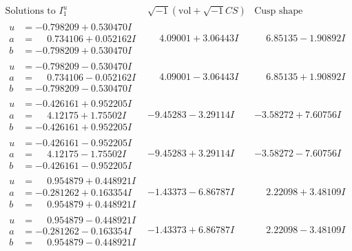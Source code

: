 \documentclass[1p]{elsarticle_modified}
\theoremstyle{definition}
\newcommand{\I}{\sqrt{-1}}
\begin{document}
$$\begin{array}{c|c|c}  
\text{Solutions to }I^u_{1}& \I (\text{vol} + \sqrt{-1}CS) & \text{Cusp shape}\\
 \hline 
\begin{aligned}
u &= -0.798209 + 0.530470 I \\
a &= \phantom{-}0.734106 + 0.052162 I \\
b &= -0.798209 + 0.530470 I\end{aligned}
 & \phantom{-}4.09001 + 3.06443 I & \phantom{-}6.85135 - 1.90892 I \\ \hline\begin{aligned}
u &= -0.798209 - 0.530470 I \\
a &= \phantom{-}0.734106 - 0.052162 I \\
b &= -0.798209 - 0.530470 I\end{aligned}
 & \phantom{-}4.09001 - 3.06443 I & \phantom{-}6.85135 + 1.90892 I \\ \hline\begin{aligned}
u &= -0.426161 + 0.952205 I \\
a &= \phantom{-}4.12175 + 1.75502 I \\
b &= -0.426161 + 0.952205 I\end{aligned}
 & -9.45283 - 3.29114 I & -3.58272 + 7.60756 I \\ \hline\begin{aligned}
u &= -0.426161 - 0.952205 I \\
a &= \phantom{-}4.12175 - 1.75502 I \\
b &= -0.426161 - 0.952205 I\end{aligned}
 & -9.45283 + 3.29114 I & -3.58272 - 7.60756 I \\ \hline\begin{aligned}
u &= \phantom{-}0.954879 + 0.448921 I \\
a &= -0.281262 + 0.163354 I \\
b &= \phantom{-}0.954879 + 0.448921 I\end{aligned}
 & -1.43373 - 6.86787 I & \phantom{-}2.22098 + 3.48109 I \\ \hline\begin{aligned}
u &= \phantom{-}0.954879 - 0.448921 I \\
a &= -0.281262 - 0.163354 I \\
b &= \phantom{-}0.954879 - 0.448921 I\end{aligned}
 & -1.43373 + 6.86787 I & \phantom{-}2.22098 - 3.48109 I \\ \hline\begin{aligned}

\end{aligned}
\end{array}$$
\end{document}
